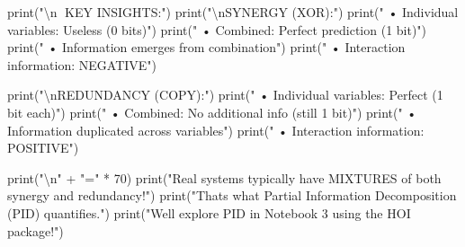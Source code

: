 \documentclass[
  11pt,
  letterpaper,
  oneside,
  openany]{book}
\newenvironment{Shaded}{\begin{snugshade}}{\end{snugshade}}
\newcommand{\BuiltInTok}[1]{\textcolor[rgb]{0.00,0.23,0.31}{#1}}
\newcommand{\CharTok}[1]{\textcolor[rgb]{0.13,0.47,0.30}{#1}}
\newcommand{\DecValTok}[1]{\textcolor[rgb]{0.68,0.00,0.00}{#1}}
\newcommand{\NormalTok}[1]{\textcolor[rgb]{0.00,0.23,0.31}{#1}}
\newcommand{\OperatorTok}[1]{\textcolor[rgb]{0.37,0.37,0.37}{#1}}
\newcommand{\StringTok}[1]{\textcolor[rgb]{0.13,0.47,0.30}{#1}}
\begin{document}
\begin{Shaded}
\begin{Highlighting}[]
\BuiltInTok{print}\NormalTok{(}\StringTok{"}\CharTok{\textbackslash{}n}\StringTok{🎯 KEY INSIGHTS:"}\NormalTok{)}
\BuiltInTok{print}\NormalTok{(}\StringTok{"}\CharTok{\textbackslash{}n}\StringTok{SYNERGY (XOR):"}\NormalTok{)}
\BuiltInTok{print}\NormalTok{(}\StringTok{"  • Individual variables: Useless (0 bits)"}\NormalTok{)}
\BuiltInTok{print}\NormalTok{(}\StringTok{"  • Combined: Perfect prediction (1 bit)"}\NormalTok{)}
\BuiltInTok{print}\NormalTok{(}\StringTok{"  • Information \textquotesingle{}emerges\textquotesingle{} from combination"}\NormalTok{)}
\BuiltInTok{print}\NormalTok{(}\StringTok{"  • Interaction information: NEGATIVE"}\NormalTok{)}

\BuiltInTok{print}\NormalTok{(}\StringTok{"}\CharTok{\textbackslash{}n}\StringTok{REDUNDANCY (COPY):"}\NormalTok{)}
\BuiltInTok{print}\NormalTok{(}\StringTok{"  • Individual variables: Perfect (1 bit each)"}\NormalTok{)}
\BuiltInTok{print}\NormalTok{(}\StringTok{"  • Combined: No additional info (still 1 bit)"}\NormalTok{)}
\BuiltInTok{print}\NormalTok{(}\StringTok{"  • Information \textquotesingle{}duplicated\textquotesingle{} across variables"}\NormalTok{)}
\BuiltInTok{print}\NormalTok{(}\StringTok{"  • Interaction information: POSITIVE"}\NormalTok{)}

\BuiltInTok{print}\NormalTok{(}\StringTok{"}\CharTok{\textbackslash{}n}\StringTok{"} \OperatorTok{+} \StringTok{"="} \OperatorTok{*} \DecValTok{70}\NormalTok{)}
\BuiltInTok{print}\NormalTok{(}\StringTok{"Real systems typically have MIXTURES of both synergy and redundancy!"}\NormalTok{)}
\BuiltInTok{print}\NormalTok{(}\StringTok{"That\textquotesingle{}s what Partial Information Decomposition (PID) quantifies."}\NormalTok{)}
\BuiltInTok{print}\NormalTok{(}\StringTok{"We\textquotesingle{}ll explore PID in Notebook 3 using the HOI package!"}\NormalTok{)}
\end{Highlighting}
\end{Shaded}
\end{document}
